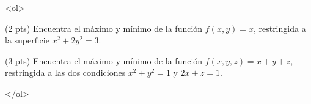 \documentclass[12pt]{article}
\begin{document}
\bigskip

            
\bigskip
\bigskip
\bigskip






<ol>

\item (2 pts) Encuentra el máximo y mínimo de la función $f(x,y)=x$, restringida a la superficie
$x^2+2y^2=3$.


  \vspace{8cm}


\item (3 pts) Encuentra el máximo y mínimo de la función $f(x,y,z)=x+y+z$, restringida
a las dos condiciones $x^2+y^2=1$ y $2x+z=1$.
  

</ol>
 





  
\end{document}

